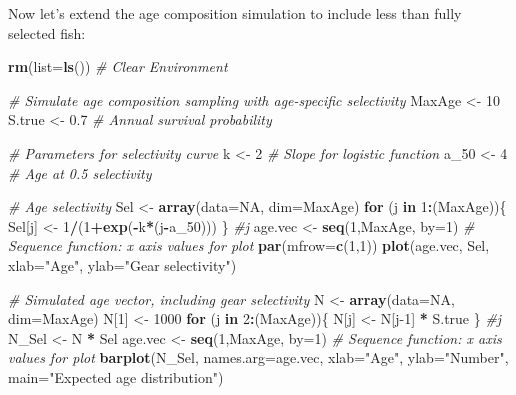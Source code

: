 \documentclass[
]{krantz}
\makeatletter
\newenvironment{Shaded}{\begin{snugshade}}{\end{snugshade}}
\newcommand{\AttributeTok}[1]{\textcolor[rgb]{0.27,0.27,0.27}{#1}}
\newcommand{\CommentTok}[1]{\textcolor[rgb]{0.37,0.37,0.37}{\textit{#1}}}
\newcommand{\ConstantTok}[1]{\textcolor[rgb]{0.37,0.37,0.37}{#1}}
\newcommand{\ControlFlowTok}[1]{\textcolor[rgb]{0.27,0.27,0.27}{\textbf{#1}}}
\newcommand{\DecValTok}[1]{\textcolor[rgb]{0.06,0.06,0.06}{#1}}
\newcommand{\FloatTok}[1]{\textcolor[rgb]{0.06,0.06,0.06}{#1}}
\newcommand{\FunctionTok}[1]{\textcolor[rgb]{0.27,0.27,0.27}{\textbf{#1}}}
\newcommand{\NormalTok}[1]{#1}
\newcommand{\OtherTok}[1]{\textcolor[rgb]{0.37,0.37,0.37}{#1}}
\newcommand{\SpecialCharTok}[1]{\textcolor[rgb]{0.43,0.43,0.43}{\textbf{#1}}}
\newcommand{\StringTok}[1]{\textcolor[rgb]{0.5,0.5,0.5}{#1}}
\newenvironment{kframe}{%
\medskip{}
\setlength{\fboxsep}{.8em}
 \def\at@end@of@kframe{}%
 \ifinner\ifhmode%
  \def\at@end@of@kframe{\end{minipage}}%
  \begin{minipage}{\columnwidth}%
 \fi\fi%
 \def\FrameCommand##1{\hskip\@totalleftmargin \hskip-\fboxsep
 \colorbox{shadecolor}{##1}\hskip-\fboxsep
     \hskip-\linewidth \hskip-\@totalleftmargin \hskip\columnwidth}%
 \MakeFramed {\advance\hsize-\width
   \@totalleftmargin\z@ \linewidth\hsize
   \@setminipage}}%
 {\par\unskip\endMakeFramed%
 \at@end@of@kframe}
\renewenvironment{Shaded}{\begin{kframe}}{\end{kframe}}
\makeatother
\begin{document}
Now let's extend the age composition simulation to include less than fully selected fish:

\begin{Shaded}
\begin{Highlighting}[]
\FunctionTok{rm}\NormalTok{(}\AttributeTok{list=}\FunctionTok{ls}\NormalTok{()) }\CommentTok{\# Clear Environment}

\CommentTok{\# Simulate age composition sampling with age{-}specific selectivity}
\NormalTok{MaxAge }\OtherTok{\textless{}{-}} \DecValTok{10}
\NormalTok{S.true }\OtherTok{\textless{}{-}} \FloatTok{0.7} \CommentTok{\# Annual survival probability}

\CommentTok{\# Parameters for selectivity curve}
\NormalTok{k }\OtherTok{\textless{}{-}} \DecValTok{2} \CommentTok{\# Slope for logistic function}
\NormalTok{a\_50 }\OtherTok{\textless{}{-}} \DecValTok{4} \CommentTok{\# Age at 0.5 selectivity}

\CommentTok{\# Age selectivity}
\NormalTok{Sel }\OtherTok{\textless{}{-}} \FunctionTok{array}\NormalTok{(}\AttributeTok{data=}\ConstantTok{NA}\NormalTok{, }\AttributeTok{dim=}\NormalTok{MaxAge)}
\ControlFlowTok{for}\NormalTok{ (j }\ControlFlowTok{in} \DecValTok{1}\SpecialCharTok{:}\NormalTok{(MaxAge))\{}
\NormalTok{  Sel[j] }\OtherTok{\textless{}{-}} \DecValTok{1}\SpecialCharTok{/}\NormalTok{(}\DecValTok{1}\SpecialCharTok{+}\FunctionTok{exp}\NormalTok{(}\SpecialCharTok{{-}}\NormalTok{k}\SpecialCharTok{*}\NormalTok{(j}\SpecialCharTok{{-}}\NormalTok{a\_50)))}
\NormalTok{\} }\CommentTok{\#j}
\NormalTok{age.vec }\OtherTok{\textless{}{-}} \FunctionTok{seq}\NormalTok{(}\DecValTok{1}\NormalTok{,MaxAge, }\AttributeTok{by=}\DecValTok{1}\NormalTok{)  }\CommentTok{\# Sequence function: x axis values for plot}
\FunctionTok{par}\NormalTok{(}\AttributeTok{mfrow=}\FunctionTok{c}\NormalTok{(}\DecValTok{1}\NormalTok{,}\DecValTok{1}\NormalTok{))}
\FunctionTok{plot}\NormalTok{(age.vec, Sel, }\AttributeTok{xlab=}\StringTok{"Age"}\NormalTok{, }\AttributeTok{ylab=}\StringTok{"Gear selectivity"}\NormalTok{)}

\CommentTok{\# Simulated age vector, including gear selectivity}
\NormalTok{N }\OtherTok{\textless{}{-}} \FunctionTok{array}\NormalTok{(}\AttributeTok{data=}\ConstantTok{NA}\NormalTok{, }\AttributeTok{dim=}\NormalTok{MaxAge)}
\NormalTok{N[}\DecValTok{1}\NormalTok{] }\OtherTok{\textless{}{-}} \DecValTok{1000}
\ControlFlowTok{for}\NormalTok{ (j }\ControlFlowTok{in} \DecValTok{2}\SpecialCharTok{:}\NormalTok{(MaxAge))\{}
\NormalTok{  N[j] }\OtherTok{\textless{}{-}}\NormalTok{ N[j}\DecValTok{{-}1}\NormalTok{] }\SpecialCharTok{*}\NormalTok{ S.true}
\NormalTok{\} }\CommentTok{\#j}
\NormalTok{N\_Sel }\OtherTok{\textless{}{-}}\NormalTok{ N }\SpecialCharTok{*}\NormalTok{ Sel}
\NormalTok{age.vec }\OtherTok{\textless{}{-}} \FunctionTok{seq}\NormalTok{(}\DecValTok{1}\NormalTok{,MaxAge, }\AttributeTok{by=}\DecValTok{1}\NormalTok{)  }\CommentTok{\# Sequence function: x axis values for plot}
\FunctionTok{barplot}\NormalTok{(N\_Sel, }\AttributeTok{names.arg=}\NormalTok{age.vec, }\AttributeTok{xlab=}\StringTok{"Age"}\NormalTok{, }\AttributeTok{ylab=}\StringTok{"Number"}\NormalTok{, }
        \AttributeTok{main=}\StringTok{"Expected age distribution"}\NormalTok{)}


\end{Highlighting}
\end{Shaded}
\end{document}
